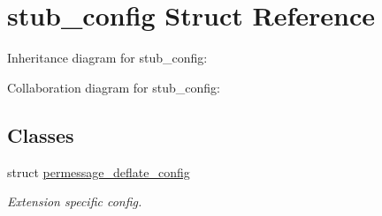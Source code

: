 \hypertarget{structstub__config}{}\section{stub\+\_\+config Struct Reference}
\label{structstub__config}


Inheritance diagram for stub\+\_\+config\+:


Collaboration diagram for stub\+\_\+config\+:
\subsection*{Classes}
\begin{DoxyCompactItemize}
\item 
struct \mbox{\hyperlink{structstub__config_1_1permessage__deflate__config}{permessage\+\_\+deflate\+\_\+config}}
\begin{DoxyCompactList}\small\item\em Extension specific config. \end{DoxyCompactList}\end{DoxyCompactItemize}
